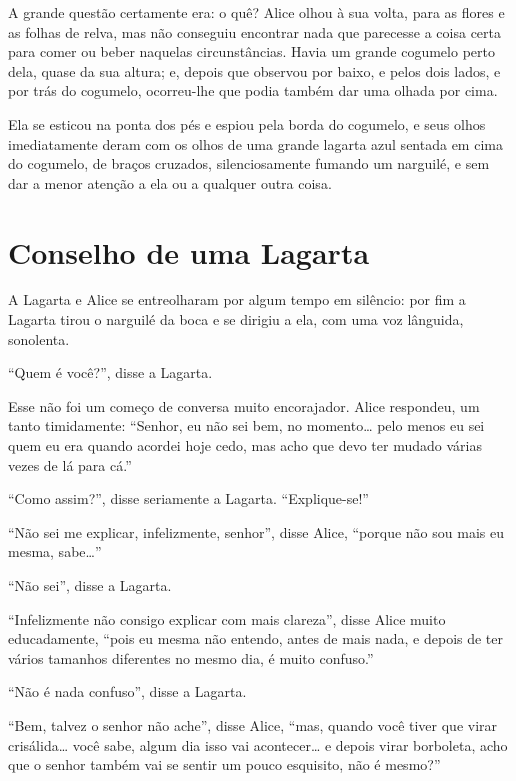 A grande questão certamente era: o quê? Alice olhou à sua volta, para as
flores e as folhas de relva, mas não conseguiu encontrar nada que
parecesse a coisa certa para comer ou beber naquelas circunstâncias.
Havia um grande cogumelo perto dela, quase da sua altura; e, depois que
observou por baixo, e pelos dois lados, e por trás do cogumelo,
ocorreu-lhe que podia também dar uma olhada por cima.

Ela se esticou na ponta dos pés e espiou pela borda do cogumelo, e seus
olhos imediatamente deram com os olhos de uma grande lagarta azul
sentada em cima do cogumelo, de braços cruzados, silenciosamente fumando
um narguilé, e sem dar a menor atenção a ela ou a qualquer outra coisa.

\quebra\chapter{Conselho de uma Lagarta}

\vspace*{-2\baselineskip}

A Lagarta e Alice se entreolharam por algum tempo em silêncio: por fim a
Lagarta tirou o narguilé da boca e se dirigiu a ela, com uma voz
lânguida, sonolenta.

``Quem é você?'', disse a Lagarta.

Esse não foi um começo de conversa muito encorajador. Alice respondeu,
um tanto timidamente: ``Senhor, eu não sei bem, no momento\ldots{} pelo menos
eu sei quem eu era quando acordei hoje cedo, mas acho que devo ter
mudado várias vezes de lá para cá.''

``Como assim?'', disse seriamente a Lagarta. ``Explique-se!''

``Não sei me explicar, infelizmente, senhor'', disse Alice, ``porque não
sou mais eu mesma, sabe\ldots{}''

``Não sei'', disse a Lagarta.

``Infelizmente não consigo explicar com mais clareza'', disse Alice
muito educadamente, ``pois eu mesma não entendo, antes de mais nada, e
depois de ter vários tamanhos diferentes no mesmo dia, é muito
confuso.''

``Não é nada confuso'', disse a Lagarta.

``Bem, talvez o senhor não ache'', disse Alice, ``mas, quando você tiver
que virar crisálida\ldots{} você sabe, algum dia isso vai acontecer\ldots{} e
depois virar borboleta, acho que o senhor também vai se sentir um pouco
esquisito, não é mesmo?''

